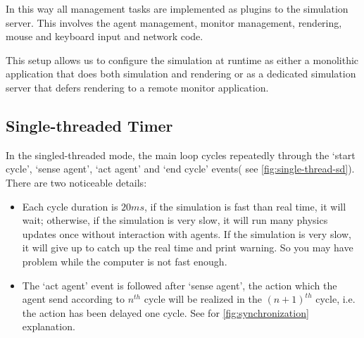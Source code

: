 In this way all management tasks are implemented as plugins to the
simulation server. This involves the agent management, monitor
management, rendering, mouse and keyboard input and network code.

This setup allows us to configure the simulation at runtime as either
a monolithic application that does both simulation and rendering or as
a dedicated simulation server that defers rendering to a remote
monitor application.





\subsection{Single-threaded Timer}
In the singled-threaded mode, the main loop cycles repeatedly through
the `start cycle', `sense agent', `act agent' and `end cycle' events(
see \autoref{fig:single-thread-sd}). There are two noticeable details:
\begin{itemize}
\item Each cycle duration is $20ms$, if the simulation is fast than real
  time, it will wait; otherwise, if the simulation is very slow, it
  will run many physics updates once without interaction with agents.
  If the simulation is very slow, it will give up to catch up the real
  time and print warning. So you may have problem while the computer
  is not fast enough.
\item The `act agent' event is followed after `sense agent', the
  action which the agent send according to $n^{th}$ cycle will be
  realized in the $(n+1)^{th}$ cycle, i.e. the action has been delayed
  one cycle. See for \autoref{fig:synchronization} explanation.
\end{itemize}

